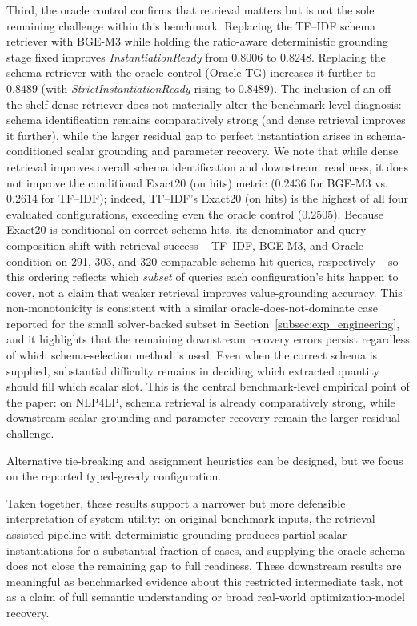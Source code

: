 \documentclass[3p]{elsarticle}
\begin{document}
Third, the oracle control confirms that retrieval matters but is not the sole remaining challenge within this benchmark. Replacing the TF--IDF schema retriever with BGE-M3 while holding the ratio-aware deterministic grounding stage fixed improves \textit{InstantiationReady} from $0.8006$ to $0.8248$. Replacing the schema retriever with the oracle control (Oracle-TG) increases it further to $0.8489$ (with \textit{StrictInstantiationReady} rising to $0.8489$). The inclusion of an off-the-shelf dense retriever does not materially alter the benchmark-level diagnosis: schema identification remains comparatively strong (and dense retrieval improves it further), while the larger residual gap to perfect instantiation arises in schema-conditioned scalar grounding and parameter recovery. We note that while dense retrieval improves overall schema identification and downstream readiness, it does not improve the conditional Exact20 (on hits) metric ($0.2436$ for BGE-M3 vs.\ $0.2614$ for TF--IDF); indeed, TF--IDF's Exact20 (on hits) is the highest of all four evaluated configurations, exceeding even the oracle control ($0.2505$). Because Exact20 is conditional on correct schema hits, its denominator and query composition shift with retrieval success -- TF--IDF, BGE-M3, and Oracle condition on 291, 303, and 320 comparable schema-hit queries, respectively -- so this ordering reflects which \emph{subset} of queries each configuration's hits happen to cover, not a claim that weaker retrieval improves value-grounding accuracy. This non-monotonicity is consistent with a similar oracle-does-not-dominate case reported for the small solver-backed subset in Section~\ref{subsec:exp_engineering}, and it highlights that the remaining downstream recovery errors persist regardless of which schema-selection method is used. Even when the correct schema is supplied, substantial difficulty remains in deciding which extracted quantity should fill which scalar slot. This is the central benchmark-level empirical point of the paper: on \textsc{NLP4LP}, schema retrieval is already comparatively strong, while downstream scalar grounding and parameter recovery remain the larger residual challenge.

Alternative tie-breaking and assignment heuristics can be designed, but we focus on the reported typed-greedy configuration.

Taken together, these results support a narrower but more defensible interpretation of system utility: on original benchmark inputs, the retrieval-assisted pipeline with deterministic grounding produces partial scalar instantiations for a substantial fraction of cases, and supplying the oracle schema does not close the remaining gap to full readiness. These downstream results are meaningful as benchmarked evidence about this restricted intermediate task, not as a claim of full semantic understanding or broad real-world optimization-model recovery.
\end{document}
